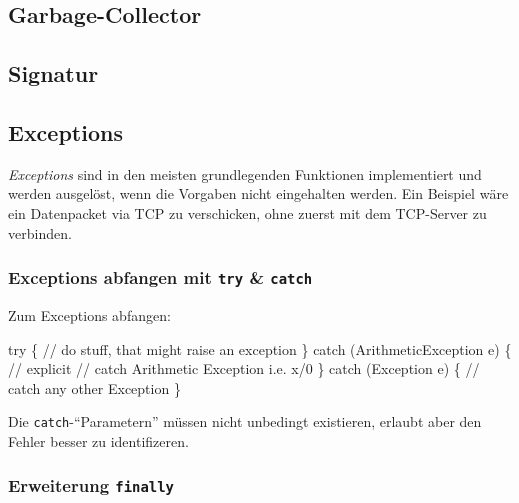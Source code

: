 \documentclass[
  9pt,
  a4paperpaper,
  DIV=11]{scrartcl}
\newenvironment{Shaded}{}{}
\newcommand{\CommentTok}[1]{\textcolor[rgb]{0.42,0.45,0.49}{#1}}
\newcommand{\KeywordTok}[1]{\textcolor[rgb]{0.84,0.23,0.29}{#1}}
\newcommand{\NormalTok}[1]{\textcolor[rgb]{0.14,0.16,0.18}{#1}}
\newcommand{\OperatorTok}[1]{\textcolor[rgb]{0.14,0.16,0.18}{#1}}
\numberwithin{equation}{section}
\begin{document}
\begin{multicols}{2}
\hypertarget{garbage-collector}{%
\subsection{Garbage-Collector}\label{garbage-collector}}

\hypertarget{signatur}{%
\subsection{Signatur}\label{signatur}}

\hypertarget{exceptions}{%
\subsection{Exceptions}\label{exceptions}}

\emph{Exceptions} sind in den meisten grundlegenden Funktionen
implementiert und werden ausgelöst, wenn die Vorgaben nicht eingehalten
werden. Ein Beispiel wäre ein Datenpacket via TCP zu verschicken, ohne
zuerst mit dem TCP-Server zu verbinden.

\hypertarget{exceptions-abfangen-mit-try-catch}{%
\subsubsection{\texorpdfstring{Exceptions abfangen mit \texttt{try} \&
\texttt{catch}}{Exceptions abfangen mit try \& catch}}\label{exceptions-abfangen-mit-try-catch}}

Zum Exceptions abfangen:

\begin{Shaded}
\begin{Highlighting}[]
\KeywordTok{try} \OperatorTok{\{}
  \CommentTok{// do stuff, that might raise an exception}
\OperatorTok{\}}
\KeywordTok{catch} \OperatorTok{(}\NormalTok{ArithmeticException e}\OperatorTok{)} \OperatorTok{\{} \CommentTok{// explicit}
  \CommentTok{// catch Arithmetic Exception i.e. x/0}
\OperatorTok{\}}
\KeywordTok{catch} \OperatorTok{(}\NormalTok{Exception e}\OperatorTok{)} \OperatorTok{\{}
  \CommentTok{// catch any other Exception}
\OperatorTok{\}}
\end{Highlighting}
\end{Shaded}

Die \texttt{catch}-``Parametern'' müssen nicht unbedingt existieren,
erlaubt aber den Fehler besser zu identifizeren.

\hypertarget{erweiterung-finally}{%
\subsubsection{\texorpdfstring{Erweiterung
\texttt{finally}}{Erweiterung finally}}\label{erweiterung-finally}}


\end{multicols}
\end{document}
